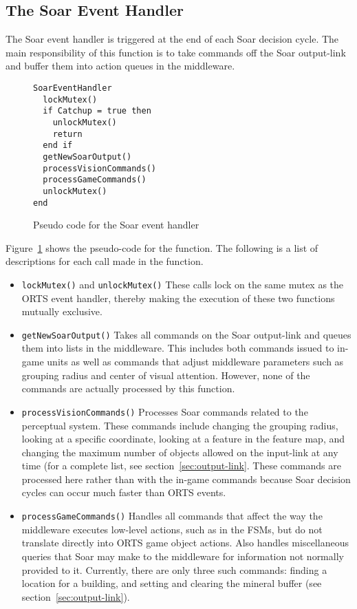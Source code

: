 \subsection{The Soar Event Handler}
\label{sec:SoarEventHandler}

The Soar event handler is triggered at the end of each Soar decision
cycle. The main responsibility of this function is to take commands off
the Soar output-link and buffer them into action queues in the
middleware.

\begin{figure}
\begin{verbatim}
SoarEventHandler
  lockMutex()
  if Catchup = true then
    unlockMutex()
    return
  end if
  getNewSoarOutput()
  processVisionCommands()
  processGameCommands()
  unlockMutex()
end
\end{verbatim}
\caption{Pseudo code for the Soar event handler}
\label{fig:SoarEventHandler}
\end{figure}

Figure~\ref{fig:SoarEventHandler} shows the pseudo-code for the
function. The following is a list of descriptions for each call made in
the function.

\begin{itemize}

\item \verb|lockMutex()| and \verb|unlockMutex()|
  These calls lock on the same mutex as the ORTS event handler, thereby
  making the execution of these two functions mutually exclusive.

\item \verb|getNewSoarOutput()|
  Takes all commands on the Soar output-link and queues them into lists
  in the middleware. This includes both commands issued to in-game units
  as well as commands that adjust middleware parameters such as grouping
  radius and center of visual attention. However, none of the commands
  are actually processed by this function.

\item \verb|processVisionCommands()|
  Processes Soar commands related to the perceptual system. These
  commands include changing the grouping radius, looking at a specific
  coordinate, looking at a feature in the feature map, and changing the
  maximum number of objects allowed on the input-link at any time (for
  a complete list, see section~\ref{sec:output-link}. These commands
  are processed here rather than with the in-game commands because Soar decision cycles can occur much faster than ORTS events.

\item \verb|processGameCommands()|
  Handles all commands that affect the way the middleware executes
  low-level actions, such as in the FSMs, but do not translate directly
  into ORTS game object actions. Also handles miscellaneous queries that
  Soar may make to the middleware for information not normally provided
  to it. Currently, there are only three such commands: finding a
  location for a building, and setting and clearing the mineral buffer
  (see section~\ref{sec:output-link}).

\end{itemize}
